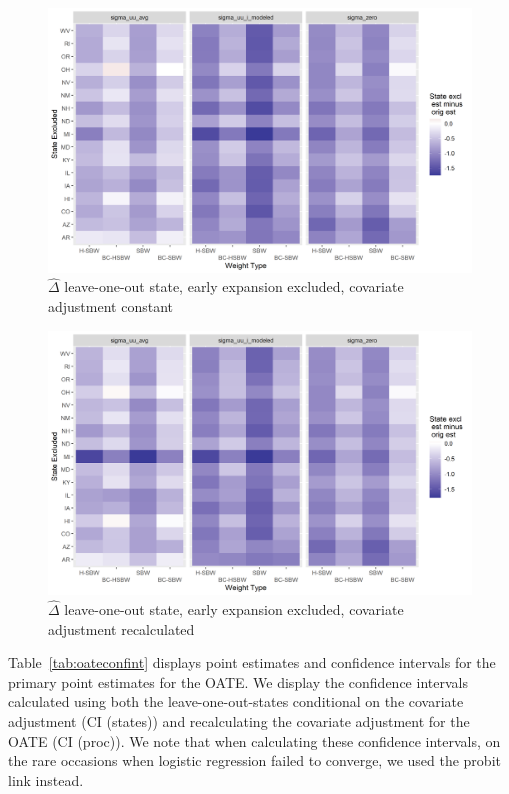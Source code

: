 \documentclass[aoas]{imsart}
\theoremstyle{plain}
\theoremstyle{remark}
\begin{document}
\begin{appendix}
\begin{figure}[]
\begin{center}
    \caption{$\hat{\Delta}$ leave-one-out state, early expansion excluded, covariate adjustment constant}
    \label{fig:rdiffc2state}
    \includegraphics[scale=0.6]{01_Plots/loostate-repub-sensitivityc2-state-main.png}
\end{center}
\end{figure}

\begin{figure}[]
\begin{center}
    \caption{$\hat{\Delta}$ leave-one-out state, early expansion excluded, covariate adjustment recalculated}
    \label{fig:rdiffc2proc}
    \includegraphics[scale=0.6]{01_Plots/loostate-repub-sensitivityc2-proc-main.png}
\end{center}
\end{figure}

Table~\ref{tab:oateconfint} displays point estimates and confidence intervals for the primary point estimates for the OATE. We display the confidence intervals calculated using both the leave-one-out-states conditional on the covariate adjustment (CI (states)) and recalculating the covariate adjustment for the OATE (CI (proc)). We note that when calculating these confidence intervals, on the rare occasions when logistic regression failed to converge, we used the probit link instead.


\end{appendix}
\end{document}
